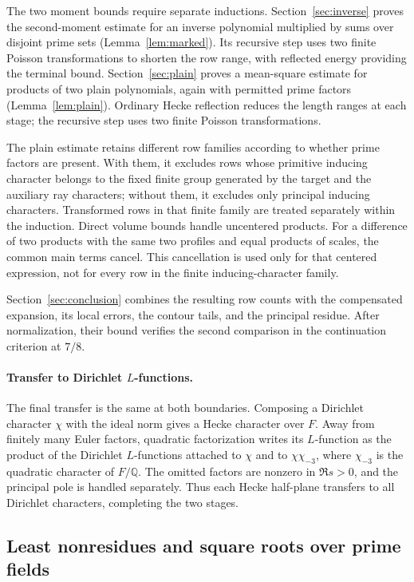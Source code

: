 The two moment bounds require separate inductions.
Section~\ref{sec:inverse} proves the second-moment estimate for an inverse
polynomial multiplied by sums over disjoint prime sets
(Lemma~\ref{lem:marked}). Its recursive step uses two finite Poisson
transformations to shorten the row range, with reflected energy providing
the terminal bound. Section~\ref{sec:plain} proves a mean-square estimate
for products of two plain polynomials, again with permitted prime factors
(Lemma~\ref{lem:plain}). Ordinary Hecke reflection reduces the length
ranges at each stage; the recursive step uses two finite Poisson
transformations.

The plain estimate retains different row families according to whether
prime factors are present. With them, it excludes rows whose primitive
inducing character belongs to the fixed finite group generated by the
target and the auxiliary ray characters; without them, it excludes only
principal inducing characters. Transformed rows in that finite family
are treated separately within the induction. Direct volume bounds handle
uncentered products. For a difference of two products with the same two
profiles and equal products of scales, the common main terms cancel.
This cancellation is used only for that centered expression, not for every
row in the finite inducing-character family.

Section~\ref{sec:conclusion} combines the resulting row counts with the
compensated expansion, its local errors, the contour tails, and the
principal residue. After normalization, their bound verifies the second
comparison in the continuation criterion at $7/8$.

\paragraph{Transfer to Dirichlet $L$-functions.}
The final transfer is the same at both boundaries. Composing a Dirichlet
character $\chi$ with the ideal norm gives a Hecke character over $F$.
Away from finitely many Euler factors, quadratic factorization writes its
$L$-function as the product of the Dirichlet $L$-functions attached to $\chi$
and to $\chi\chi_{-3}$, where $\chi_{-3}$ is the quadratic character of
$F/\mathbb Q$. The omitted factors are nonzero in $\Re s>0$, and the
principal pole is handled separately. Thus each Hecke half-plane transfers
to all Dirichlet characters, completing the two stages.

\subsection*{Least nonresidues and square roots over prime fields}

